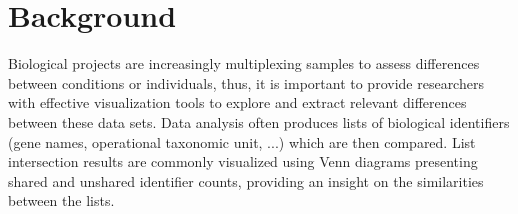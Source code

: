 \documentclass{bmcart}
\begin{document}
\begin{frontmatter}
\begin{abstractbox}
\begin{abstract}
\end{abstract}


\begin{keyword}
\end{keyword}


\end{abstractbox}
%

\end{frontmatter}




\section*{Background}

Biological projects are increasingly multiplexing samples to assess differences between conditions or individuals, 
thus, it is important to provide researchers with effective visualization tools to explore and extract 
relevant differences between these data sets. Data analysis often produces lists of biological identifiers 
(gene names, operational taxonomic unit, ...) which are then compared. List intersection 
results are commonly visualized using Venn diagrams \cite{Venn1880} presenting shared and unshared identifier 
counts, providing an insight on the similarities between the lists.
\end{document}
